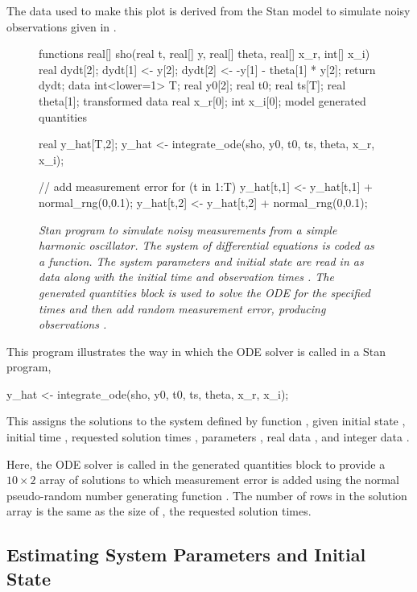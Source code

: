 The data used to make this plot is derived from the Stan model to
simulate noisy observations given in .
%
\begin{figure}
\begin{stancode}
functions {
  real[] sho(real t,
             real[] y, 
             real[] theta,
             real[] x_r,
             int[] x_i) {
    real dydt[2];
    dydt[1] <- y[2];
    dydt[2] <- -y[1] - theta[1] * y[2];
    return dydt;
  }
}
data {
  int<lower=1> T;
  real y0[2];
  real t0;
  real ts[T];
  real theta[1];
}
transformed data {
  real x_r[0];
  int x_i[0];
}
model {
}
generated quantities {
  real y_hat[T,2];
  y_hat <- integrate_ode(sho, y0, t0, ts, theta, x_r, x_i);

  // add measurement error
  for (t in 1:T) {
    y_hat[t,1] <- y_hat[t,1] + normal_rng(0,0.1);
    y_hat[t,2] <- y_hat[t,2] + normal_rng(0,0.1);
  }
}
\end{stancode}
\vspace*{-0.2in}
\caption{\small\it Stan program to simulate noisy measurements from a
  simple harmonic oscillator.  The system of differential equations is
  coded as a function.  The system parameters  and initial
  state  are read in as data along with the initial time
   and observation times . The generated quantities
  block is used to solve the ODE for the specified times and then add
  random measurement error, producing observations .}\label{sho-sim.figure}
\end{figure}

This program illustrates the way in which the ODE solver is called in
a Stan program,
%
\begin{stancode}
y_hat <- integrate_ode(sho, y0, t0, ts, theta, x_r, x_i);
\end{stancode}
%
This assigns the solutions to the system defined by function
, given initial state , initial time ,
requested solution times , parameters , real data
, and integer data .

Here, the ODE solver is called in the generated quantities block to
provide a $10 \times 2$ array of solutions  to
which measurement error is added using the normal pseudo-random number
generating function .  The number of rows in the
solution array is the same as the size of , the requested
solution times.

\subsection{Estimating System Parameters and Initial State}

